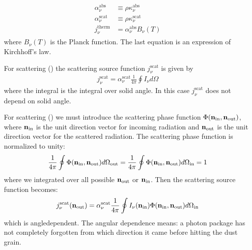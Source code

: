 \documentclass[letterpaper,10pt,english]{sphinxmanual}
\begin{document}
\label{\detokenize{dustradtrans:eq-thermal-source-function}}\begin{equation*}
\begin{split}\begin{split}
\alpha_\nu^{\mathrm{abs}} &\equiv \rho\kappa_\nu^{\mathrm{abs}}\\
\alpha_\nu^{\mathrm{scat}} &\equiv \rho\kappa_\nu^{\mathrm{scat}}\\
j_\nu^{\mathrm{therm}} &= \alpha_\nu^{\mathrm{abs}} B_\nu(T)
\end{split}\end{split}
\end{equation*}
where \(B_\nu(T)\) is the Planck function. The last equation is an
expression of Kirchhoff’s law.

For  scattering () the
scattering source function \(j_\nu^{\mathrm{scat}}\) is given by
\begin{equation*}
\begin{split}j_\nu^{\mathrm{scat}} = \alpha_\nu^{\mathrm{scat}} \frac{1}{4\pi}\oint I_\nu d\Omega\end{split}
\end{equation*}
where the integral is the integral over solid angle. In this case
\(j_\nu^{\mathrm{scat}}\) does not depend on solid angle.

For  scattering () we
must introduce the scattering phase function
\(\Phi({\bf n}_{\mathrm{in}}, {\bf n}_{\mathrm{out}})\), where
\({\bf n}_{\mathrm{in}}\) is the unit direction vector for incoming radiation
and \({\bf n}_{\mathrm{out}}\) is the unit direction vector for the scattered
radiation. The
scattering phase function is normalized to unity:
\begin{equation*}
\begin{split}\frac{1}{4\pi}\oint\Phi({\bf n}_{\mathrm{in}},
{\bf n}_{\mathrm{out}}) d\Omega_{\mathrm{out}}
=\frac{1}{4\pi}\oint\Phi({\bf n}_{\mathrm{in}},
{\bf n}_{\mathrm{out}}) d\Omega_{\mathrm{in}}=1\end{split}
\end{equation*}
where we integrated over all possible \({\bf n}_{\mathrm{out}}\) or
\({\bf n}_{\mathrm{in}}\).
Then the scattering source function becomes:
\begin{equation*}
\begin{split}\begin{split}
j_\nu^{\mathrm{scat}}({\bf n}_{\mathrm{out}}) =
\alpha_\nu^{\mathrm{scat}} \frac{1}{4\pi}\oint I_\nu({\bf n}_{\mathrm{in}})
\Phi({\bf n}_{\mathrm{in}},{\bf n}_{\mathrm{out}}) d\Omega_{\mathrm{in}}
\end{split}\end{split}
\end{equation*}
which is angle\sphinxhyphen{}dependent. The angular dependence means: a photon package has not
completely forgotten from which direction it came before hitting the dust grain.
\end{document}

